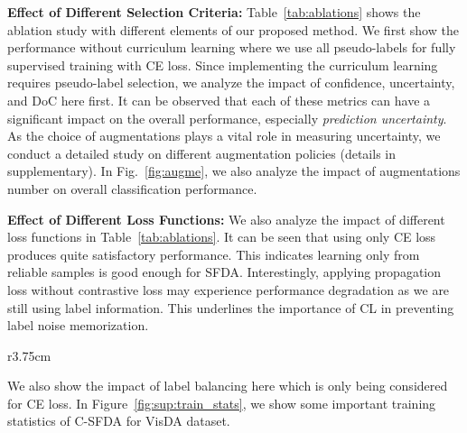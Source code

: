 \documentclass[10pt,twocolumn,letterpaper]{article}
\begin{document}
\vspace{0.6mm}
\noindent \textbf{Effect of Different Selection Criteria:}
Table~\ref{tab:ablations} shows the ablation study with different elements of our proposed method. We first show the performance without curriculum learning where we use all pseudo-labels for fully supervised training with CE loss. Since implementing the curriculum learning requires pseudo-label selection, we analyze the impact of confidence, uncertainty, and DoC here first. It can be observed that each of these metrics can have a significant impact on the overall performance, especially \emph{prediction uncertainty}. As the choice of augmentations plays a vital role in measuring uncertainty, we conduct a detailed study on different augmentation policies (details in supplementary). In Fig.~\ref{fig:augme}, we also analyze the impact of augmentations number  on overall classification performance.  

\vspace{0.6mm}
\noindent \textbf{Effect of Different Loss Functions:}
We also analyze the impact of different loss functions in Table~\ref{tab:ablations}. It can be seen that using only CE loss produces quite satisfactory performance. This indicates learning only from reliable samples is good enough for SFDA. Interestingly, applying propagation loss without contrastive loss may experience performance degradation as we are still using label information. 
This underlines the importance of CL in preventing label noise memorization. 
\begin{wraptable}{r}{3.75cm}
        \centering
        \vspace{-2.5mm}
        \caption{\textbf{\footnotesize Effect of Curriculum}}
        \vspace{-2.5mm}
        \vspace{-2.5mm}
        \label{tab:currculum}
\end{wraptable}
We also show the impact of label balancing here which is only being considered for CE loss. In Figure~\ref{fig:sup:train_stats}, we show some important training statistics of C-SFDA for VisDA dataset. 
\end{document}
